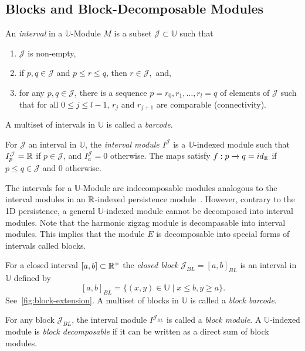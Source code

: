 \documentclass[10pt,a4paper]{amsart}
\newcommand {\mm}[1] {\ifmmode{#1}\else{\mbox{\(#1\)}}\fi}
\newcommand{\Rspace}        {\mm{\mathbb{R}}}
\theoremstyle{definition}
\theoremstyle{remark}
\providecommand{\cal}{\mathcal}
\begin{document}
\subsection{Blocks and Block-Decomposable Modules}


An \emph{interval} in a $\mathbb{U}$-Module $M$ is a subset ${\cal{J}} \subset \mathbb{U}$ such that 
\begin{enumerate}
    \item ${\cal{J}}$ is non-empty,
    \item if $p,q \in {\cal{J}}$ and $p \leq r \leq q$, then $r \in {\cal{J}},$ and,
    \item for any $p,q \in {\cal{J}}$, there is a sequence $p = r_0, r_1, \ldots, r_l = q$ of elements of ${\cal{J}}$ such that for all $0 \leq j \leq l-1$, $r_j$ and $r_{j+1}$ are comparable (connectivity). 
\end{enumerate}

A multiset of intervals in $\mathbb{U}$ is called a \emph{barcode}.

For ${\cal{J}}$ an interval in $\mathbb{U}$, the \emph{interval module $I^{{\cal{J}}}$} is a $\mathbb{U}$-indexed module such that $I^{{\cal{J}}}_p = \Rspace$ if $p \in {\cal{J}}$, and $I_a^{{\cal{J}}}=0$ otherwise. The maps satisfy $f:p\xrightarrow{} q = id_{\Rspace}$ if $p \leq q \in {\cal{J}}$ and $0$ otherwise.


The intervals for a $\mathbb{U}$-Module are indecomposable modules analogous to the interval modules in an $\Rspace$-indexed persistence module~\cite[Prop. 2.2]{botnan2018algebraic}. However, contrary to the 1D persistence, a general $\mathbb{U}$-indexed module cannot be  decomposed into interval modules. Note that the harmonic zigzag module is decompasable into interval modules. This implies that the module $E$ is decomposable into special forms of intervals called blocks.

For a closed interval $[a,b] \subset \Rspace^+$ the \emph{closed block} ${\mathcal{J}_{BL}} = [a,b]_{BL}$ is an interval in $\mathbb{U}$ defined by $$ [a,b]_{BL} = \{ (x,y) \in \mathbb{U}\mid  x \leq b,  y \geq a \}.$$ See~\cref{fig:block-extension}. 
A multiset of blocks in $\mathbb{U}$ is called a \emph{block barcode}. 




For any block ${\mathcal{J}_{BL}}$, the interval module $I^{{\mathcal{J}_{BL}}}$ is called a \emph{block module}. 
A $\mathbb{U}$-indexed module is \emph{block decomposable} if it can be written as a direct sum of block modules. 
\end{document}
